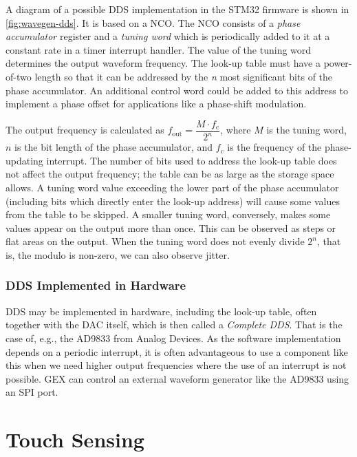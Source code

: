A diagram of a possible \gls{DDS} implementation in the STM32 firmware is shown in \cref{fig:wavegen-dds}. It is based on a \gls{NCO}. The \gls{NCO} consists of a \textit{phase accumulator} register and a \textit{tuning word} which is periodically added to it at a constant rate in a timer interrupt handler. The value of the tuning word determines the output waveform frequency. The look-up table must have a power-of-two length so that it can be addressed by the \textit{n} most significant bits of the phase accumulator. An additional control word could be added to this address to implement a phase offset for applications like a phase-shift modulation.

The output frequency is calculated as \(f_\mathrm{out} = \dfrac{M\cdot f_\mathrm{c}}{2^n}\), where $M$ is the tuning word, $n$ is the bit length of the phase accumulator, and $f_c$ is the frequency of the phase-updating interrupt. The number of bits used to address the look-up table does not affect the output frequency; the table can be as large as the storage space allows. A tuning word value exceeding the lower part of the phase accumulator (including bits which directly enter the look-up address) will cause some values from the table to be skipped. A smaller tuning word, conversely, makes some values appear on the output more than once. This can be observed as steps or flat areas on the output. When the tuning word does not evenly divide $2^n$, that is, the modulo is non-zero, we can also observe jitter.

\subsubsection{DDS Implemented in Hardware}

DDS may be implemented in hardware, including the look-up table, often together with the \gls{DAC} itself, which is then called a \textit{Complete \gls{DDS}}. That is the case of, e.g., the AD9833 from Analog Devices. As the software implementation depends on a periodic interrupt, it is often advantageous to use a component like this when we need higher output frequencies where the use of an interrupt is not possible. GEX can control an external waveform generator like the AD9833 using an \gls{SPI} port.

\section{Touch Sensing} \label{sec:theory-touch}


